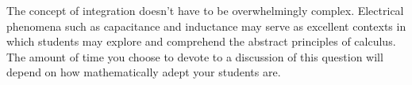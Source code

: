 





The concept of integration doesn't have to be overwhelmingly complex.  Electrical phenomena such as capacitance and inductance may serve as excellent contexts in which students may explore and comprehend the abstract principles of calculus.  The amount of time you choose to devote to a discussion of this question will depend on how mathematically adept your students are.




